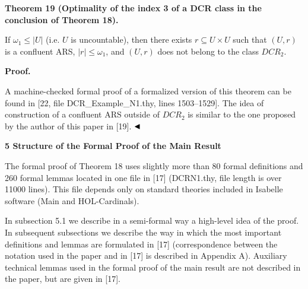  
 
\par\medskip\noindent\textbf{Theorem 19 (Optimality of the index 3 of a DCR class in the conclusion of Theorem 18).}\par
 
 
If $\omega_{1}\leq|U|$ (i.e. $U$ is uncountable), then there exists $r\subseteq U\times U$ such that $(U,r)$ is a confluent ARS, $|r|\leq\omega_{1}$, and $(U,r)$ does not belong to the class $DCR_{2}$.\par
 
 
 
 
\par\medskip\noindent\textbf{Proof.}\par
 
 
A machine-checked formal proof of a formalized version of this theorem can be found in [22, file DCR\_Example\_N1.thy, lines 1503–1529]. The idea of construction of a confluent ARS outside of $DCR_{2}$ is similar to the one proposed by the author of this paper in [19]. $\hfill\blacktriangleleft$\par
 
 
 


 
\par\medskip\noindent\textbf{5 Structure of the Formal Proof of the Main Result}\par
 
 
The formal proof of Theorem 18 uses slightly more than 80 formal definitions and 260 formal lemmas located in one file in [17] (DCRN1.thy, file length is over 11000 lines). This file depends only on standard theories included in Isabelle software (Main and HOL-Cardinals).\par
 
 
 
In subsection 5.1 we describe in a semi-formal way a high-level idea of the proof. In subsequent subsections we describe the way in which the most important definitions and lemmas are formulated in [17] (correspondence between the notation used in the paper and in [17] is described in Appendix A). Auxiliary technical lemmas used in the formal proof of the main result are not described in the paper, but are given in [17].\par
 
